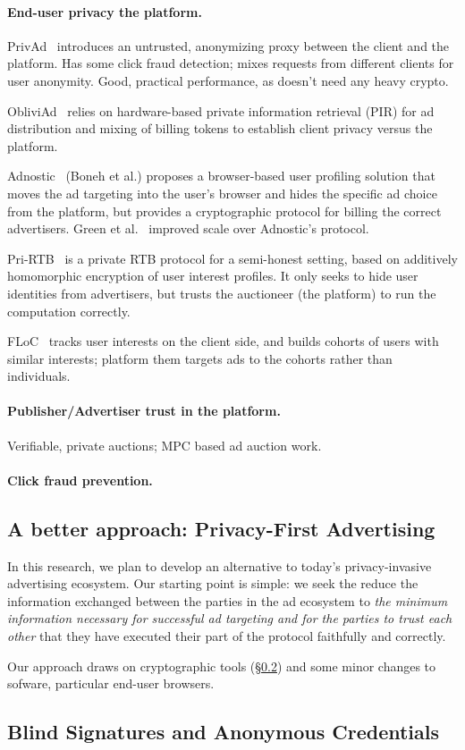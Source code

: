 \paragraph{End-user privacy \vs the platform.}
%
PrivAd~\cite{privad} introduces an untrusted, anonymizing proxy between the
client and the platform.
%
Has some click fraud detection; mixes requests from different clients for user
anonymity.
%
Good, practical performance, as doesn't need any heavy crypto.
%

%
ObliviAd~\cite{obliviad} relies on hardware-based private information retrieval
(PIR) for ad distribution and mixing of billing tokens to establish client
privacy versus the platform.
%

%
Adnostic~\cite{adnostic} (Boneh et al.) proposes a browser-based user profiling
solution that moves the ad targeting into the user's browser and hides the
specific ad choice from the platform, but provides a cryptographic protocol for
billing the correct advertisers.
%
Green et al.~\cite{adnostic+} improved scale over Adnostic's protocol.
%

Pri-RTB~\cite{pri-rtb} is a private RTB protocol for a semi-honest setting,
based on additively homomorphic encryption of user interest profiles.
%
It only seeks to hide user identities from advertisers, but trusts the
auctioneer (the platform) to run the computation correctly.
%

%
FLoC~\cite{floc} tracks user interests on the client side, and builds cohorts of
users with similar interests; platform them targets ads to the cohorts rather
than individuals.
%

\paragraph{Publisher/Advertiser trust in the platform.}

%
Verifiable, private auctions; MPC based ad auction work.
%

\paragraph{Click fraud prevention.}
%
%

\subsection{A better approach: Privacy-First Advertising}

%
In this research, we plan to develop an alternative to today's privacy-invasive
advertising ecosystem.
%
Our starting point is simple: we seek the reduce the information exchanged
between the parties in the ad ecosystem to \emph{the minimum information
necessary for successful ad targeting and for the parties to trust each other}
that they have executed their part of the protocol faithfully and correctly.
%

%
Our approach draws on cryptographic tools (\S\ref{s:bg-crypto}) and some minor
changes to sofware, particular end-user browsers.

\subsection{Blind Signatures and Anonymous Credentials}
\label{s:bg-crypto}

